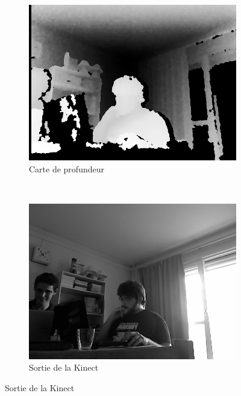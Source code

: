 \documentclass[a4paper,12pt]{article}
\begin{document}
\begin{center} 
  \begin{figure}
    \centering
      \begin{subfigure}[b]{0.3\textwidth}
      \includegraphics[scale=0.25]{img/image00}
      \caption{Carte de profundeur}
      \label{fig:cartedeprofondeur}
      \end{subfigure}%
      ~
      \begin{subfigure}[b]{0.3\textwidth}
        \includegraphics[scale=0.25]{img/image09}
      \caption{Sortie de la Kinect}
      \label{fig:kinectsortie}
      \end{subfigure}%
  \end{figure}
\end{center}
\end{document}
